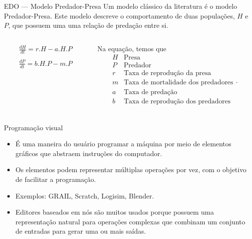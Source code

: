 \begin{frame}{EDO — Modelo Predador-Presa}
    Um modelo clássico da literatura é o modelo Predador-Presa. Este modelo descreve o comportamento de duas populações, $H$ e $P$, que possuem uma uma relação de predação entre si. 

    \begin{columns}
        \begin{column}{.3\textwidth}
            \begin{equation}\label{eq:predadorpresa}
                \begin{array}{lr}
                    \frac{dH}{dt} = r.H - a.H.P
                    \\
                    \\
                    \frac{dP}{dt} = b.H.P - m.P
                \end{array}
            \end{equation}
        \end{column}
        \begin{column}{.6\textwidth}
            Na equação, temos que
            \[
            \begin{array}{lr}
                H & \text{Presa}\\
                P & \text{Predador}\\
                r & \text{Taxa de reprodução da presa}\\
                m & \text{Taxa de mortalidade dos predadores}\\
                a & \text{Taxa de predação}\\
                b & \text{Taxa de reprodução dos predadores}\\
                \end{array}.
            \]
        \end{column}
    \end{columns}

\end{frame}
    
\begin{frame}{Programação visual}
    \begin{itemize}
        \item É uma maneira do usuário programar a máquina por meio de elementos gráficos que abstraem instruções do computador. \item Os elementos podem representar múltiplas operações por vez, com o objetivo de facilitar a programação.
        \item Exemplos: GRAIL, Scratch, Logisim, Blender. 
        \item Editores baseados em nós são muitos usados porque possuem uma representação natural para operações complexas que combinam um conjunto de entradas para gerar uma ou mais saídas. 
    \end{itemize}    
\end{frame}

